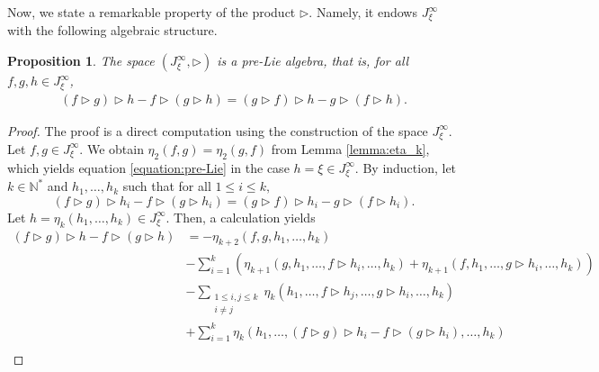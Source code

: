 \documentclass[a4paper,11pt]{article}
\newtheorem{proposition}[theorem]{Proposition}
\begin{document}
Now, we state a remarkable property of the product $\triangleright.$ Namely, it endows $J_\xi^\infty$ with the following algebraic structure.

\begin{proposition}
\label{proposition:post-Lie}
The space $(J_\xi^\infty,\triangleright)$ is a pre-Lie algebra, that is, for all $f,g,h\in J_\xi^\infty$,
\begin{align}
\label{equation:pre-Lie}
(f\triangleright g)\triangleright h-f\triangleright (g\triangleright h)=(g\triangleright f)\triangleright h-g\triangleright (f\triangleright h).
\end{align}
\end{proposition}


\begin{proof}
The proof is a direct computation using the construction of the space $J_\xi^\infty.$ Let $f,g \in J_\xi^\infty.$ We obtain $\eta_2(f,g) = \eta_2(g,f)$ from Lemma \ref{lemma:eta_k}, which yields equation \eqref{equation:pre-Lie} in the case $h=\xi \in J_\xi^\infty.$
By induction, let $k \in \mathbb{N}^*$ and $h_1, \ldots, h_k$ such that for all $1 \leq i \leq k,$
\[
(f\triangleright g)\triangleright h_i-f\triangleright (g\triangleright h_i)=(g\triangleright f)\triangleright h_i-g\triangleright (f\triangleright h_i).
\]
Let $h=\eta_k(h_1, \ldots, h_k) \in J_\xi^\infty.$ Then, a calculation yields
\begin{align*}
(f\triangleright g)\triangleright h-f\triangleright (g\triangleright h)
&=-\eta_{k+2}(f, g, h_1, \ldots,  h_k)
\\
&-\sum\limits_{i=1}^k (\eta_{k+1}(g, h_1, \ldots, f \triangleright h_i, \ldots, h_k) + \eta_{k+1}(f, h_1, \ldots, g \triangleright h_i, \ldots, h_k))\\
&-\sum\limits_{\substack{1 \leq i,j \leq k \\ i \neq j} } \eta_k(h_1, \ldots, f \triangleright h_j, \ldots, g \triangleright h_i, \ldots, h_k)\\
&+\sum\limits_{i=1}^k \eta_k(h_1, \ldots, (f \triangleright g) \triangleright h_i-f \triangleright (g \triangleright h_i) , \ldots, h_k)\\

\end{align*}
\end{proof}
\end{document}
